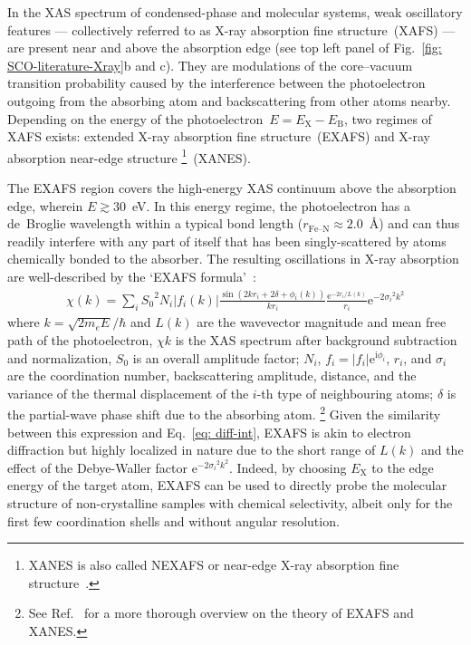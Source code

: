In the XAS spectrum of condensed-phase and molecular systems,
weak oscillatory features ---
collectively referred to as X-ray absorption fine structure~(XAFS) ---
are present near and above the absorption edge
(see top left panel of Fig.~\ref{fig: SCO-literature-Xray}b and c).
%
They are modulations of the core--vacuum transition probability
caused by the interference between the photoelectron outgoing from the absorbing atom
and backscattering from other atoms nearby.
%
Depending on the energy of the photoelectron~$E = E_\text{X} - E_\text{B}$,
two regimes of XAFS exists: extended X-ray absorption fine structure~(EXAFS)
and X-ray absorption near-edge structure%
\footnote{XANES is also called NEXAFS or near-edge X-ray absorption fine structure~\cite{Bordwehr1989}.}~(XANES).

The EXAFS region covers the high-energy XAS continuum above the absorption edge,
wherein $E \gtrsim 30$~eV.
In this energy regime, the photoelectron has a de~Broglie wavelength
within a typical bond length ($r_\text{Fe–N} \approx 2.0$~\AA{})
and can thus readily interfere with any part of itself
that has been singly-scattered by atoms chemically bonded to the absorber.
%
The resulting oscillations in X-ray absorption are well-described by
the `EXAFS formula'~\cite{Sayers1971, Rehr2000}:
%
\begin{equation}
  \begin{aligned}
    \chi(k) = \sum_i {S_0}^2 N_i |f_i(k)| \frac{\sin(2 k r_i + 2 \delta + \phi_i(k)) }{k r_i}
      \frac{\text{e}^{-2 r_i / L(k) }}{r_i} \text{e}^{-2 {\sigma_i}^2 k^2}
    \label{eq: EXAFS}
  \end{aligned}
\end{equation}
%
where $k = \sqrt{2 m_e E}/\hbar$ and $L(k)$ are the wavevector magnitude
and mean free path of the photoelectron,
$\chi{k}$ is the XAS spectrum after background subtraction and normalization,
$S_0$ is an overall amplitude factor;
$N_i$, $f_i = |f_i| \text{e}^{\text{i} \phi_i}$, $r_i$, and $\sigma_i$ are the coordination number, backscattering amplitude, distance, and the variance of the thermal displacement
of the $i$-th type of neighbouring atoms;
$\delta$ is the partial-wave phase shift due to the absorbing atom.%
\footnote{See Ref.~\cite{Rehr2000} for a more thorough overview on the theory of EXAFS and XANES.}
Given the similarity between this expression and Eq.~\eqref{eq: diff-int},
EXAFS is akin to electron diffraction
but highly localized in nature due to the short range of $L(k)$ and
the effect of the Debye-Waller factor $\text{e}^{-2 {\sigma_i}^2 k^2}$.
%
Indeed, by choosing $E_\text{X}$ to the edge energy of the target atom,
EXAFS can be used to directly probe the molecular structure of non-crystalline samples
with chemical selectivity, albeit only for the first few coordination shells
and without angular resolution.


